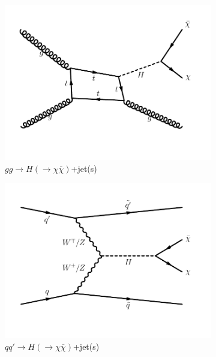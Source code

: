 \begin{figure}
    \begin{center}
        \begin{subfigure}[t]{0.32\textwidth}
            \includegraphics[width=\textwidth]{figures/vbf/diagrams/ggf_hinv.pdf}
            \caption{$gg\rightarrow H(\rightarrow\chi\bar\chi)$+jet(s)}
        \end{subfigure}
        \begin{subfigure}[t]{0.32\textwidth}
            \includegraphics[width=\textwidth]{figures/vbf/diagrams/vbf_hinv.pdf}
            \caption{$qq'\rightarrow H(\rightarrow\chi\bar\chi)$+jet(s)}
        \end{subfigure}
        \begin{subfigure}[t]{0.32\textwidth}

\end{subfigure}
\end{center}
\end{figure}
